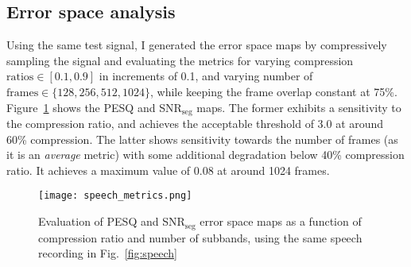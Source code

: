 \subsection{Error space analysis}
\label{ssec:audio-speech-error}
Using the same test signal, I generated the error space maps by compressively sampling the signal and evaluating the metrics for varying compression $\textrm{ratios} \in [0.1, 0.9]$ in increments of 0.1, and varying number of $\textrm{frames} \in \{128, 256, 512, 1024\}$, while keeping the frame overlap constant at 75\%. Figure~\ref{fig:speech-error} shows the PESQ and SNR$_\mathrm{seg}$ maps. The former exhibits a sensitivity to the compression ratio, and achieves the acceptable threshold of 3.0 at around 60\% compression. The latter shows sensitivity towards the number of frames (as it is an \textit{average} metric) with some additional degradation below 40\% compression ratio. It achieves a maximum value of 0.08 at around 1024 frames.

\begin{figure}[htb]
	\centering
	\texttt{[image: speech\_metrics.png]}
	\caption{Evaluation of PESQ and SNR$_\mathrm{seg}$ error space maps as a function of compression ratio and number of subbands, using the same speech recording in Fig.~\ref{fig:speech}}
	\label{fig:speech-error}
\end{figure}